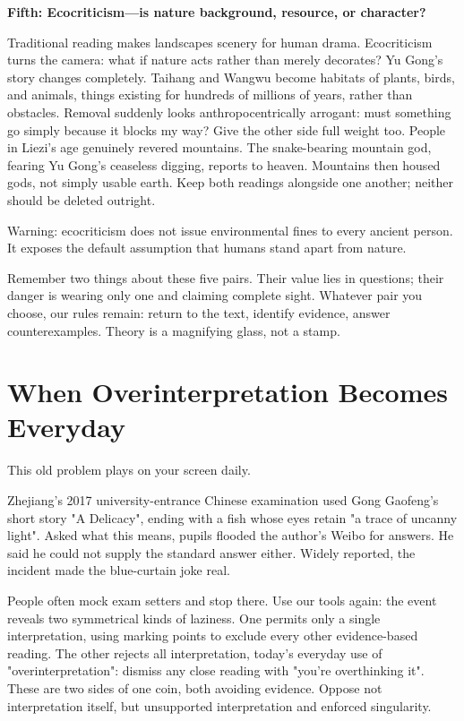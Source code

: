 \textbf{Fifth: Ecocriticism---is nature background, resource, or character?}

Traditional reading makes landscapes scenery for human drama. Ecocriticism turns the camera: what if nature acts rather than merely decorates? Yu Gong's story changes completely. Taihang and Wangwu become habitats of plants, birds, and animals, things existing for hundreds of millions of years, rather than obstacles. Removal suddenly looks anthropocentrically arrogant: must something go simply because it blocks my way? Give the other side full weight too. People in Liezi's age genuinely revered mountains. The snake-bearing mountain god, fearing Yu Gong's ceaseless digging, reports to heaven. Mountains then housed gods, not simply usable earth. Keep both readings alongside one another; neither should be deleted outright.

Warning: ecocriticism does not issue environmental fines to every ancient person. It exposes the default assumption that humans stand apart from nature.

Remember two things about these five pairs. Their value lies in questions; their danger is wearing only one and claiming complete sight. Whatever pair you choose, our rules remain: return to the text, identify evidence, answer counterexamples. Theory is a magnifying glass, not a stamp.

\section{When Overinterpretation Becomes Everyday}
This old problem plays on your screen daily.

Zhejiang's 2017 university-entrance Chinese examination used Gong Gaofeng's short story "A Delicacy", ending with a fish whose eyes retain "a trace of uncanny light". Asked what this means, pupils flooded the author's Weibo for answers. He said he could not supply the standard answer either. Widely reported, the incident made the blue-curtain joke real.

People often mock exam setters and stop there. Use our tools again: the event reveals two symmetrical kinds of laziness. One permits only a single interpretation, using marking points to exclude every other evidence-based reading. The other rejects all interpretation, today's everyday use of "overinterpretation": dismiss any close reading with "you're overthinking it". These are two sides of one coin, both avoiding evidence. Oppose not interpretation itself, but unsupported interpretation and enforced singularity.


